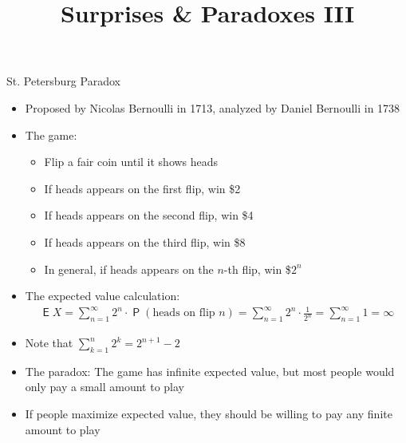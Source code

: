 \documentclass[10pt,handout]{beamer}
\title{Surprises \& Paradoxes III}
\author{}
\date{}
\DeclareMathOperator\prb{\mathsf{P}}
\DeclareMathOperator\expc{\mathsf{E}}
\begin{document}
\begin{frame}
\titlepage
\end{frame}


\begin{frame}{St. Petersburg Paradox}
  \begin{itemize}[<+->]
    \item Proposed by Nicolas Bernoulli in 1713, analyzed by Daniel Bernoulli in 1738
    \item The game:
      \begin{itemize}
        \item Flip a fair coin until it shows heads
        \item If heads appears on the first flip, win \$2
        \item If heads appears on the second flip, win \$4
        \item If heads appears on the third flip, win \$8
        \item In general, if heads appears on the $n$-th flip, win \$$2^n$
      \end{itemize}
    \item The expected value calculation:
      \begin{align*}
        \expc{X} = \sum_{n=1}^{\infty} 2^n \cdot \prb(\text{heads on flip } n) = \sum_{n=1}^{\infty} 2^n \cdot \frac{1}{2^n} = \sum_{n=1}^{\infty} 1 = \infty
      \end{align*}
    \item Note that $\sum_{k=1}^n 2^k = 2^{n + 1} - 2$
    \item The paradox: The game has infinite expected value, but most people would only pay a small amount to play
    \item If people maximize expected value, they should be willing to pay any finite amount to play
  \end{itemize}
\end{frame}
\end{document}
